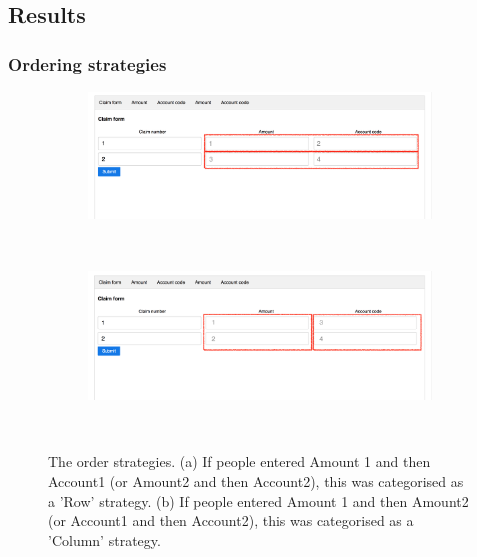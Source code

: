 \begin{table}
\begin{itemize}
\subsection{Results}

\subsubsection{Ordering strategies}
\begin{figure}[!ht]
    \centering
    \begin{subfigure}[b]{0.5\textwidth}
        \includegraphics[width=\textwidth]{images/Study4/ch34_4-roworderstr.png}
        \caption{}
        \label{fig:ch34_4-roworderstr}
    \end{subfigure}
    ~ %
    \begin{subfigure}[b]{0.5\textwidth}
        \includegraphics[width=\textwidth]{images/Study4/ch34_4-columnorderstr.png}
        \caption{}
        \label{fig:columnorderstr}
    \end{subfigure}
    ~ %
    \caption{The order strategies. (a)  If people entered Amount 1 and then Account1 (or Amount2 and then Account2), this was categorised as a 'Row' strategy. (b) If people entered Amount 1 and then Amount2 (or Account1 and then Account2), this was categorised as a 'Column' strategy.}\label{fig:ch34_4-orderstr}
\end{figure}



\end{itemize}
\end{table}
